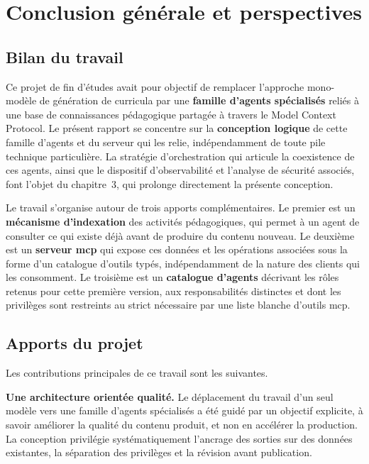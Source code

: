 \chapter*{Conclusion générale et perspectives}
\thispagestyle{plain}

\section*{Bilan du travail}

Ce projet de fin d'études avait pour objectif de remplacer
l'approche mono-modèle de génération de curricula par une
\textbf{famille d'agents spécialisés} reliés à une base de
connaissances pédagogique partagée à travers le Model Context
Protocol. Le présent rapport se concentre sur la
\textbf{conception logique} de cette famille d'agents et du
serveur qui les relie, indépendamment de toute pile technique
particulière. La stratégie d'orchestration qui articule la
coexistence de ces agents, ainsi que le dispositif d'observabilité
et l'analyse de sécurité associés, font l'objet du chapitre~3, qui
prolonge directement la présente conception.

Le travail s'organise autour de trois apports complémentaires.
Le premier est un \textbf{mécanisme d'indexation} des activités
pédagogiques, qui permet à un agent de consulter ce qui existe
déjà avant de produire du contenu nouveau. Le deuxième est un
\textbf{serveur \gls{mcp}} qui expose ces données et les
opérations associées sous la forme d'un catalogue d'outils
typés, indépendamment de la nature des clients qui les
consomment. Le troisième est un \textbf{catalogue d'agents} décrivant les
rôles retenus pour cette première version, aux responsabilités
distinctes et dont les privilèges sont restreints au strict
nécessaire par une liste blanche d'outils \gls{mcp}.

\section*{Apports du projet}

Les contributions principales de ce travail sont les suivantes.

\textbf{Une architecture orientée qualité.} Le déplacement du
travail d'un seul modèle vers une famille d'agents spécialisés a
été guidé par un objectif explicite, à savoir améliorer la
qualité du contenu produit, et non en accélérer la production.
La conception privilégie systématiquement l'ancrage des sorties
sur des données existantes, la séparation des privilèges et la
révision avant publication.

